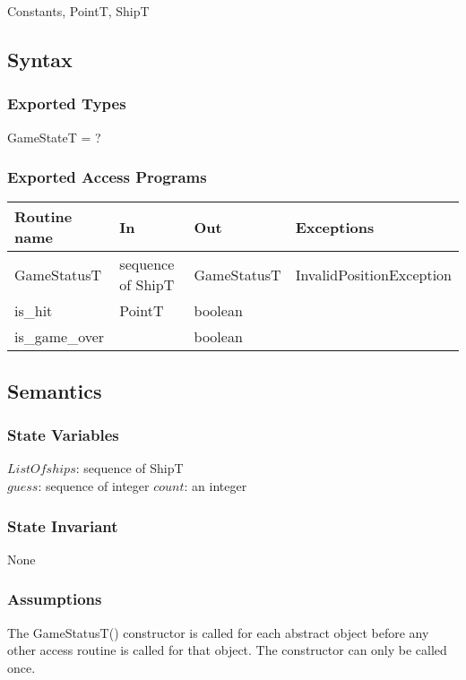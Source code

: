 \documentclass[12pt]{article}
\begin{document}
Constants, PointT, ShipT

\subsection* {Syntax}

\subsubsection* {Exported Types}
GameStateT = ?

\subsubsection* {Exported Access Programs}

\begin{tabular}{| l | l | l | p{5cm} |}
\hline
\textbf{Routine name} & \textbf{In} & \textbf{Out} & \textbf{Exceptions}\\
\hline
GameStatusT & sequence of ShipT & GameStatusT & InvalidPositionException\\
\hline
is\_hit & PointT & boolean & ~\\
\hline
is\_game\_over & ~ & boolean & ~\\
\hline

\end{tabular}

\subsection* {Semantics}

\subsubsection* {State Variables}
$ListOfships$: sequence of ShipT\\
$guess$: sequence of integer
$count$: an integer

\subsubsection* {State Invariant}
None

\subsubsection* {Assumptions}
The GameStatusT() constructor is called for each abstract object before any other access routine is called for that
object.  The constructor can only be called once.
\end{document}
